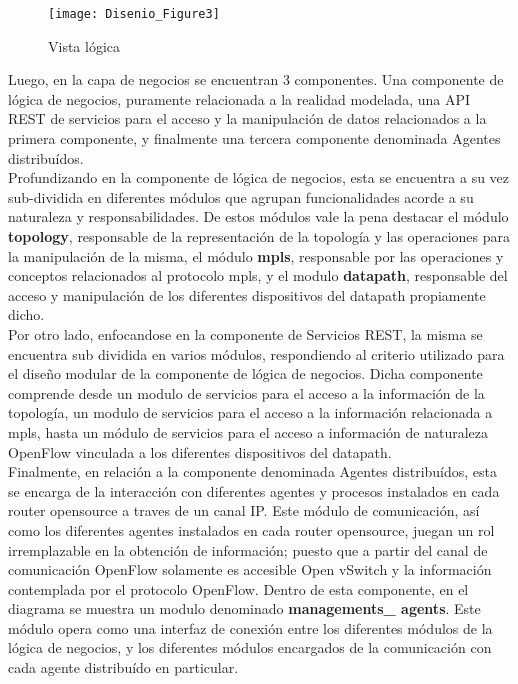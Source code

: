 \begin{figure}[ht!] 
\centering    
\texttt{[image: Disenio\_Figure3]}
\caption[Vista l\'ogica]{Vista l\'ogica}
\label{fig:VistaComponentes2}
\end{figure}

Luego, en la capa de negocios se encuentran 3 componentes. Una componente de l\'ogica de negocios, puramente relacionada a la realidad modelada, una API REST de servicios para el acceso y la manipulaci\'on de datos relacionados a la primera componente, y finalmente una tercera componente denominada Agentes distribu\'idos.\\

Profundizando en la componente de l\'ogica de negocios, esta se encuentra a su vez sub-dividida en diferentes m\'odulos que agrupan funcionalidades acorde a su naturaleza y responsabilidades. De estos m\'odulos vale la pena destacar el m\'odulo \textbf{topology}, responsable de la representaci\'on de la topolog\'ia y las operaciones para la manipulaci\'on de la misma, el m\'odulo \textbf{mpls}, responsable por las operaciones y conceptos relacionados al protocolo mpls, y el modulo \textbf{datapath}, responsable del acceso y manipulaci\'on de los diferentes dispositivos del datapath propiamente dicho.\\ 

Por otro lado, enfocandose en la componente de Servicios REST, la misma se encuentra sub dividida en varios m\'odulos, respondiendo al criterio utilizado para el dise\~no modular de la componente de l\'ogica de negocios. Dicha componente comprende desde un modulo de servicios para el acceso a la informaci\'on de la topolog\'ia, un modulo de servicios para el acceso a la informaci\'on relacionada a mpls, hasta un m\'odulo de servicios para el acceso a informaci\'on de naturaleza OpenFlow vinculada a los diferentes dispositivos del datapath.\\

Finalmente, en relaci\'on a la componente denominada Agentes distribu\'idos, esta se encarga de la interacci\'on con diferentes agentes y procesos instalados en cada router opensource a traves de un canal IP. Este m\'odulo de comunicaci\'on, as\'i como los diferentes agentes instalados en cada router opensource, juegan un rol irremplazable en la obtenci\'on de informaci\'on; puesto que a partir del canal de comunicaci\'on OpenFlow solamente es accesible Open vSwitch y la informaci\'on contemplada por el protocolo OpenFlow.
Dentro de esta componente, en el diagrama se muestra un modulo denominado \textbf{managements\_ agents}. Este m\'odulo opera como una interfaz de conexi\'on entre los diferentes m\'odulos de la l\'ogica de negocios, y los diferentes m\'odulos encargados de la comunicaci\'on con cada agente distribu\'ido en particular.\\ 

